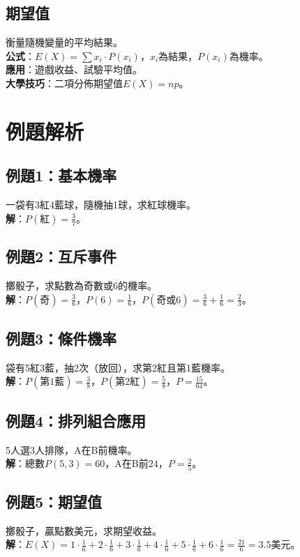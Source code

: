 \subsection{期望值}
衡量隨機變量的平均結果。\\
\textbf{公式}：$E(X) = \sum x_i \cdot P(x_i)$，$x_i$為結果，$P(x_i)$為機率。\\
\textbf{應用}：遊戲收益、試驗平均值。\\
\textbf{大學技巧}：二項分佈期望值$E(X) = np$。

\section{例題解析}

\subsection{例題1：基本機率}
一袋有3紅4藍球，隨機抽1球，求紅球機率。\\
\textbf{解}：$P(\text{紅}) = \frac{3}{7}$。

\subsection{例題2：互斥事件}
擲骰子，求點數為奇數或6的機率。\\
\textbf{解}：$P(\text{奇}) = \frac{3}{6}$，$P(6) = \frac{1}{6}$，$P(\text{奇或6}) = \frac{3}{6} + \frac{1}{6} = \frac{2}{3}$。

\subsection{例題3：條件機率}
袋有5紅3藍，抽2次（放回），求第2紅且第1藍機率。\\
\textbf{解}：$P(\text{第1藍}) = \frac{3}{8}$，$P(\text{第2紅}) = \frac{5}{8}$，$P = \frac{15}{64}$。

\subsection{例題4：排列組合應用}
5人選3人排隊，A在B前機率。\\
\textbf{解}：總數$P(5,3) = 60$，A在B前$24$，$P = \frac{2}{5}$。

\subsection{例題5：期望值}
擲骰子，贏點數美元，求期望收益。\\
\textbf{解}：$E(X) = 1 \cdot \frac{1}{6} + 2 \cdot \frac{1}{6} + 3 \cdot \frac{1}{6} + 4 \cdot \frac{1}{6} + 5 \cdot \frac{1}{6} + 6 \cdot \frac{1}{6} = \frac{21}{6} = 3.5$美元。

